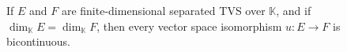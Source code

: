 If $E$ and $F$ are finite-dimensional separated TVS over $\mathbb{K}$, and if $\dim_{\mathbb{K}} E = \dim_{\mathbb{K}} F$, then every vector space isomorphism $u: E \rightarrow F$ is bicontinuous.
